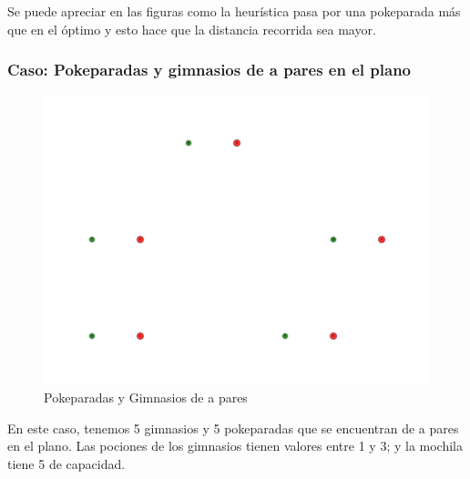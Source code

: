 Se puede apreciar en las figuras como la heurística pasa por una pokeparada más que en el óptimo y esto hace que la distancia recorrida sea mayor.


\subsubsection{Caso: Pokeparadas y gimnasios de a pares en el plano}

\begin{figure}[H]
  \begin{center}
    \includegraphics[scale=0.4]{imagenes/test2.pdf}
    \caption{Pokeparadas y Gimnasios de a pares}
    \label{fig:ej2_caso2}
  \end{center}
\end{figure}

En este caso, tenemos 5 gimnasios y 5 pokeparadas que se encuentran de a pares en el plano. Las pociones de los gimnasios tienen valores entre 1 y 3; y la mochila tiene 5 de capacidad.


